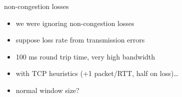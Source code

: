 \begin{frame}{non-congestion losses}
    \begin{itemize}
    \item we were ignoring non-congestion losses
    \item suppose  loss rate from transmission errors
    \vspace{.5cm}
    \item 100 ms round trip time, very high bandwidth
    \item with TCP heuristics (+1 packet/RTT, half on loss)\ldots
    \item normal window size?
    \end{itemize}
\end{frame}
